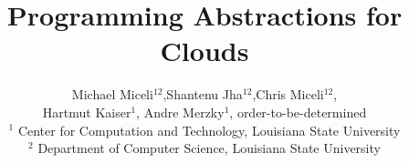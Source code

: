 \documentclass{article}
\begin{document}
\title{\large Programming Abstractions for Clouds}

\author{Michael Miceli$^{12}$,Shantenu Jha$^{12}$,Chris
  Miceli$^{12}$, \\  Hartmut Kaiser$^{1}$, Andre
  Merzky$^{1}$, order-to-be-determined
 \\[1em]
        $^1$ \small
          Center for Computation and Technology, 
          Louisiana State University\\[-0.3em]
        $^2$ \small
          Department of Computer Science, 
          Louisiana State University\\[-0.3em]
        }

\maketitle
\end{document}

